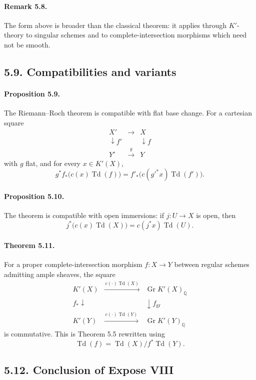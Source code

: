 \documentclass[12pt]{article}
\newcommand{\QQ}{\mathbb Q}
\newcommand{\Gr}{\operatorname{Gr}}
\newcommand{\Todd}{\operatorname{Td}}
\newcommand{\xto}[1]{\xrightarrow{#1}}
\begin{document}
\paragraph{Remark 5.8.}
The form above is broader than the classical theorem: it applies through $K'$-theory to singular schemes and to complete-intersection morphisms which need not be smooth.

\subsection*{5.9. Compatibilities and variants}

\paragraph{Proposition 5.9.}
The Riemann--Roch theorem is compatible with flat base change. For a cartesian square
\[
\begin{array}{ccc}
X'&\longrightarrow&X\\
\downarrow f'&&\downarrow f\\
Y'&\xto{g}&Y
\end{array}
\]
with $g$ flat, and for every $x\in K'(X)$,
\[
 g^* f_*\bigl(c(x)\Todd(f)\bigr)=
 f'_*\bigl(c(g'^*x)\Todd(f')\bigr).
\]

\paragraph{Proposition 5.10.}
The theorem is compatible with open immersions: if $j:U\to X$ is open, then
\[
 j^*\bigl(c(x)\Todd(X)\bigr)=c(j^*x)\Todd(U).
\]

\paragraph{Theorem 5.11.}
For a proper complete-intersection morphism $f:X\to Y$ between regular schemes admitting ample sheaves, the square
\[
\begin{array}{ccc}
K'(X) & \xto{\,c(\cdot)\Todd(X)\,} & \Gr K'(X)_\QQ \\
\scriptstyle f_*\downarrow && \downarrow\scriptstyle f_{\mathrm{gr}} \\
K'(Y) & \xto{\,c(\cdot)\Todd(Y)\,} & \Gr K'(Y)_\QQ
\end{array}
\]
is commutative. This is Theorem 5.5 rewritten using
\[
\Todd(f)=\Todd(X)/f^*\Todd(Y).
\]

\subsection*{5.12. Conclusion of Expose VIII}
\end{document}
